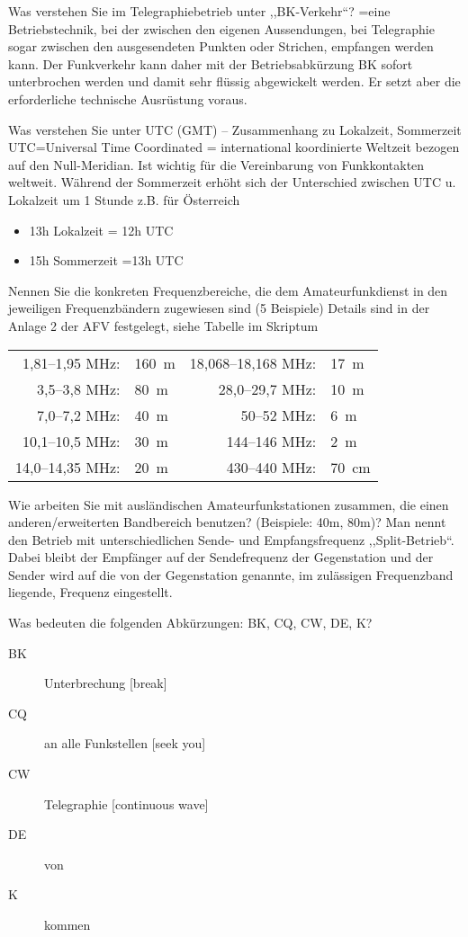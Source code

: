 \documentclass[avery5371,grid,frame,a4paper]{flashcards}
\newcommand{\card}[3]{
  \begin{flashcard}[{\chap} -- #1]{#2}#3\end{flashcard}
}
\begin{document}
\card{38}{Was verstehen Sie im Telegraphiebetrieb unter ,,BK-Verkehr``?}{
  =eine Betriebstechnik, bei der zwischen den eigenen Aussendungen, bei Telegraphie sogar zwischen den ausgesendeten Punkten oder Strichen, empfangen werden kann. Der Funkverkehr kann daher mit der Betriebsabkürzung BK sofort unterbrochen werden und damit sehr flüssig abgewickelt werden. Er setzt aber die erforderliche technische Ausrüstung voraus.
}
\card{39}{Was verstehen Sie unter UTC (GMT) -- Zusammenhang zu Lokalzeit, Sommerzeit}{
  UTC=Universal Time Coordinated = international koordinierte Weltzeit bezogen auf den Null-Meridian. Ist wichtig für die Vereinbarung von Funkkontakten weltweit. Während der Sommerzeit erhöht sich der Unterschied zwischen UTC u. Lokalzeit um 1 Stunde  z.B. für Österreich
  \begin{itemize}
    \item 13h Lokalzeit = 12h UTC
    \item  15h Sommerzeit =13h UTC
  \end{itemize}
}
\card{40}{Nennen Sie die konkreten Frequenzbereiche, die dem Amateurfunkdienst in den jeweiligen Frequenzbändern zugewiesen sind (5 Beispiele)}{
  \small
  Details sind in der Anlage 2 der AFV festgelegt, siehe Tabelle im Skriptum

  \vspace{30pt}
  \footnotesize
  \begin{tabular}{rlrl}
    1,81--1,95 MHz: & 160~m & 18,068--18,168 MHz: & 17~m \\
    3,5--3,8 MHz: & 80~m & 28,0--29,7 MHz: & 10~m \\
    7,0--7,2 MHz: & 40~m & 50--52 MHz: & 6~m \\
    10,1--10,5 MHz: & 30~m & 144--146 MHz: & 2~m \\
    14,0--14,35 MHz: & 20~m & 430--440 MHz: & 70~cm \\
  \end{tabular}
}
\card{41}{Wie arbeiten Sie mit ausländischen Amateurfunkstationen zusammen, die einen anderen/erweiterten Bandbereich benutzen? (Beispiele: 40m, 80m)?}{
  Man nennt den Betrieb mit unterschiedlichen Sende- und Empfangsfrequenz ,,Split-Betrieb``. Dabei bleibt der Empfänger auf der Sendefrequenz der Gegenstation und der Sender wird auf die von der Gegenstation genannte, im zulässigen Frequenzband liegende, Frequenz eingestellt.
}
\card{42}{Was bedeuten die folgenden Abkürzungen: BK, CQ, CW, DE, K?}{
  \begin{description}
    \item[BK] Unterbrechung [break]
    \item[CQ] an alle Funkstellen [seek you]
    \item[CW] Telegraphie [continuous wave]
    \item[DE] von
    \item[K] kommen
  \end{description}
}
\end{document}
